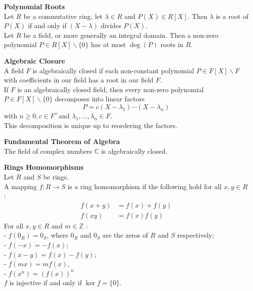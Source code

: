 \documentclass[a4paper, 10pt]{article}
\begin{document}
\begin{multicols*}{3}
\textbf{Polynomial Roots}\\
Let $R$ be a commutative ring, let $\lambda \in R$ and $P(X) \in R[X]$. Then $\lambda$ is a root of $P(X)$ if and only if $(X-\lambda)$ divides $P(X)$.\\
Let $R$ be a field, or more generally an integral domain. Then a non-zero polynomial $P \in R[X] \backslash\{0\}$ has at most $\operatorname{deg}(P)$ roots in $R$.

\textbf{Algebraic Closure}\\
A field $F$ is algebraically closed if each non-constant polynomial $P \in F[X] \backslash F$ with coefficients in our field has a root in our field $F$.\\
If $F$ is an algebraically closed field, then every non-zero polynomial $P \in F[X] \backslash\{0\}$ decomposes into linear factors
$$
P=c\left(X-\lambda_1\right) \cdots\left(X-\lambda_n\right)
$$
with $n \geqslant 0, c \in F^{\times}$and $\lambda_1, \ldots, \lambda_n \in F$.\\
This decomposition is unique up to reordering the factors.

\textbf{Fundamental Theorem of Algebra}\\
The field of complex numbers $\mathbb{C}$ is algebraically closed.

\textbf{Rings Homomorphisms}\\
Let $R$ and $S$ be rings. \\
A mapping $f: R \longrightarrow S$ is a ring homomorphism if the following hold for all $x, y \in R$ :
\begin{align*}
f(x+y) & =f(x)+f(y) \\
f(x y) & =f(x) f(y)
\end{align*}
For all $x, y \in R$ and $m \in \mathbb{Z}$ :\\
- $f\left(0_R\right)=0_S$, where $0_R$ and $0_S$ are the zeros of $R$ and $S$ respectively;\\
- $f(-x)=-f(x)$;\\
- $f(x-y)=f(x)-f(y)$;\\
- $f(m x)=m f(x)$,\\
- $f\left(x^n\right)=(f(x))^n$\\
$f$ is injective if and only if $\operatorname{ker} f=\{0\}$.


\end{multicols*}
\end{document}
